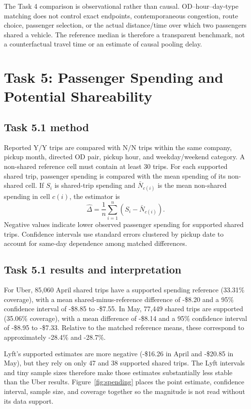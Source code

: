 \documentclass[10pt,a4paper]{article}
\newcommand{\usd}{\$}
\newcommand{\NN}{\ensuremath{\mathrm{N/N}}}
\newcommand{\YY}{\ensuremath{\mathrm{Y/Y}}}
\begin{document}
The Task 4 comparison is observational rather than causal. OD--hour--day-type matching does not control exact endpoints, contemporaneous congestion, route choice, passenger selection, or the actual distance/time over which two passengers shared a vehicle. The reference median is therefore a transparent benchmark, not a counterfactual travel time or an estimate of causal pooling delay.
\FloatBarrier

\section{Task 5: Passenger Spending and Potential Shareability}
\subsection{Task 5.1 method}
Reported \YY{} trips are compared with \NN{} trips within the same company, pickup month, directed OD pair, pickup hour, and weekday/weekend category. A non-shared reference cell must contain at least 30 trips. For each supported shared trip, passenger spending is compared with the mean spending of its non-shared cell. If $S_i$ is shared-trip spending and $\bar N_{c(i)}$ is the mean non-shared spending in cell $c(i)$, the estimator is
\[
\hat\Delta = \frac{1}{n}\sum_{i=1}^{n}\left(S_i-\bar N_{c(i)}\right).
\]
Negative values indicate lower observed passenger spending for supported shared trips. Confidence intervals use standard errors clustered by pickup date to account for same-day dependence among matched differences.

\subsection{Task 5.1 results and interpretation}
For Uber, 85,060 April shared trips have a supported spending reference (33.31\% coverage), with a mean shared-minus-reference difference of -\usd8.20 and a 95\% confidence interval of -\usd8.85 to -\usd7.55. In May, 77,449 shared trips are supported (35.06\% coverage), with a mean difference of -\usd8.14 and a 95\% confidence interval of -\usd8.95 to -\usd7.33. Relative to the matched reference means, these correspond to approximately -28.4\% and -28.7\%.

Lyft's supported estimates are more negative (-\usd16.26 in April and -\usd20.85 in May), but they rely on only 47 and 38 supported shared trips. The Lyft intervals and tiny sample sizes therefore make those estimates substantially less stable than the Uber results. Figure~\ref{fig:spending} places the point estimate, confidence interval, sample size, and coverage together so the magnitude is not read without its data support.
\end{document}

